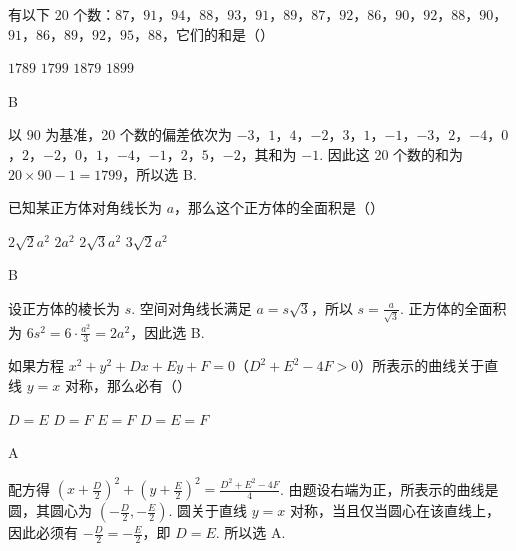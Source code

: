 \documentclass[UTF8,a4paper,oneside,11pt]{ctexbook}
\begin{document}
\begin{problem}
有以下 \(20\) 个数：\(87\)，\(91\)，\(94\)，\(88\)，\(93\)，\(91\)，\(89\)，\(87\)，\(92\)，\(86\)，\(90\)，\(92\)，\(88\)，\(90\)，\(91\)，\(86\)，\(89\)，\(92\)，\(95\)，\(88\)，它们的和是（\quad）

\choices
    {\(1789\)}
    {\(1799\)}
    {\(1879\)}
    {\(1899\)}
\end{problem}

\begin{answer}
B
\end{answer}

\begin{solution}
以 \(90\) 为基准，20 个数的偏差依次为 \(-3\)，\(1\)，\(4\)，\(-2\)，\(3\)，\(1\)，\(-1\)，\(-3\)，\(2\)，\(-4\)，\(0\)，\(2\)，\(-2\)，\(0\)，\(1\)，\(-4\)，\(-1\)，\(2\)，\(5\)，\(-2\)，其和为 \(-1\). 因此这 20 个数的和为 \(20\times90-1=1799\)，所以选 B.
\end{solution}

\begin{problem}
已知某正方体对角线长为 \(a\)，那么这个正方体的全面积是（\quad）

\choices
    {\(2\sqrt{2}a^2\)}
    {\(2a^2\)}
    {\(2\sqrt{3}a^2\)}
    {\(3\sqrt{2}a^2\)}
\end{problem}

\begin{answer}
B
\end{answer}

\begin{solution}
设正方体的棱长为 \(s\). 空间对角线长满足 \(a=s\sqrt{3}\)，所以 \(s=\frac{a}{\sqrt{3}}\). 正方体的全面积为 \(6s^2=6\cdot\frac{a^2}{3}=2a^2\)，因此选 B.
\end{solution}

\begin{problem}
如果方程 \(x^2 + y^2 + Dx + Ey + F = 0\)（\(D^2 + E^2 - 4F > 0\)）所表示的曲线关于直线 \(y = x\) 对称，那么必有（\quad）

\choices
    {\(D = E\)}
    {\(D = F\)}
    {\(E = F\)}
    {\(D = E = F\)}
\end{problem}

\begin{answer}
A
\end{answer}

\begin{solution}
配方得 \(\left(x+\frac{D}{2}\right)^2+\left(y+\frac{E}{2}\right)^2=\frac{D^2+E^2-4F}{4}\). 由题设右端为正，所表示的曲线是圆，其圆心为 \(\left(-\frac{D}{2},-\frac{E}{2}\right)\). 圆关于直线 \(y=x\) 对称，当且仅当圆心在该直线上，因此必须有 \(-\frac{D}{2}=-\frac{E}{2}\)，即 \(D=E\). 所以选 A.
\end{solution}
\end{document}
